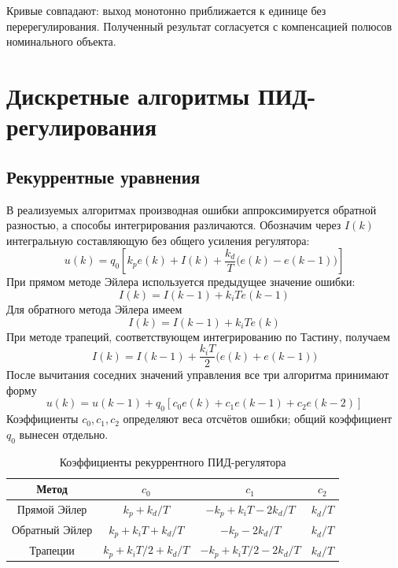 Кривые совпадают: выход монотонно приближается
к единице без перерегулирования. Полученный результат согласуется с компенсацией полюсов номинального объекта.

\section{Дискретные алгоритмы ПИД-регулирования}

\subsection{Рекуррентные уравнения}

В реализуемых алгоритмах производная ошибки аппроксимируется обратной
разностью, а способы интегрирования различаются. Обозначим через $I(k)$
интегральную составляющую без общего усиления регулятора:
\begin{equation}
  u(k)=q_0\left[k_pe(k)+I(k)
    +\frac{k_d}{T}\bigl(e(k)-e(k-1)\bigr)\right]
  \label{eq:pid-components}
\end{equation}
При прямом методе Эйлера используется предыдущее значение ошибки:
\begin{equation}
  I(k)=I(k-1)+k_iT e(k-1)
  \label{eq:forward-integral}
\end{equation}
Для обратного метода Эйлера имеем
\begin{equation}
  I(k)=I(k-1)+k_iT e(k)
  \label{eq:backward-integral}
\end{equation}
При методе трапеций, соответствующем интегрированию по Тастину,
получаем
\begin{equation}
  I(k)=I(k-1)+\frac{k_iT}{2}\bigl(e(k)+e(k-1)\bigr)
  \label{eq:tustin-integral}
\end{equation}
После вычитания соседних значений управления все три алгоритма
принимают форму
\begin{equation}
  u(k)=u(k-1)+q_0\left[c_0e(k)+c_1e(k-1)+c_2e(k-2)\right]
  \label{eq:incremental-pid}
\end{equation}
Коэффициенты $c_0,c_1,c_2$ определяют веса отсчётов ошибки;
общий коэффициент $q_0$ вынесен отдельно.

\begin{table}[!htbp]
  \centering
  \caption{Коэффициенты рекуррентного ПИД-регулятора}
  \label{tab:pid-general}
  \begin{tabular}{c c c c}
    \toprule
    Метод & $c_0$ & $c_1$ & $c_2$\\
    \midrule
    Прямой Эйлер & $k_p+k_d/T$ & $-k_p+k_iT-2k_d/T$ & $k_d/T$\\
    Обратный Эйлер & $k_p+k_iT+k_d/T$ & $-k_p-2k_d/T$ & $k_d/T$\\
    Трапеции & $k_p+k_iT/2+k_d/T$ & $-k_p+k_iT/2-2k_d/T$ & $k_d/T$\\
    \bottomrule
  \end{tabular}
\end{table}

